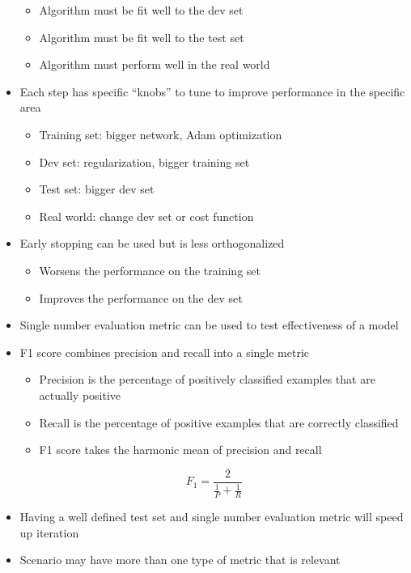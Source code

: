 \documentclass[12pt, letterpaper]{article}
\begin{document}
\begin{itemize}
\begin{itemize}
            \item Algorithm must be fit well to the dev set
            \item Algorithm must be fit well to the test set
            \item Algorithm must perform well in the real world
        \end{itemize}
        \item Each step has specific ``knobs'' to tune to improve performance in the specific area
        \begin{itemize}
            \item Training set: bigger network, Adam optimization
            \item Dev set: regularization, bigger training set
            \item Test set: bigger dev set 
            \item Real world: change dev set or cost function
        \end{itemize}
        \item Early stopping can be used but is less orthogonalized
        \begin{itemize}
            \item Worsens the performance on the training set 
            \item Improves the performance on the dev set
        \end{itemize}
        \item Single number evaluation metric can be used to test effectiveness of a model
        \item F1 score combines precision and recall into a single metric
        \begin{itemize}
            \item Precision is the percentage of positively classified examples that are actually positive
            \item Recall is the percentage of positive examples that are correctly classified
            \item F1 score takes the harmonic mean of precision and recall
        \end{itemize}
        $$F_1=\frac{2}{\frac{1}{P}+\frac{1}{R}}$$
        \item Having a well defined test set and single number evaluation metric will speed up iteration 
        \item Scenario may have more than one type of metric that is relevant
        \begin{itemize}

\end{itemize}
\end{itemize}
\end{document}
